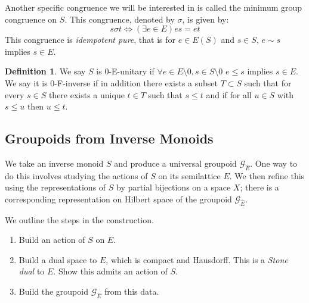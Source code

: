 \documentclass[11pt]{amsart}
\theoremstyle{plain}
\theoremstyle{definition}%
\newtheorem{definition}[theorem]{Definition}%
\theoremstyle{remark}%
\newcommand{\G}{\mathcal{G}}
\newcommand{\E}{\widehat{E}}
\begin{document}
Another specific congruence we will be interested in is called the minimum group congruence on $S$.  This congruence, denoted by $\sigma$, is given by:
\begin{equation*}
s \sigma t \Leftrightarrow (\exists e \in E) es = et
\end{equation*}
This congruence is \textit{idempotent pure}, that is for $e \in E(S)$ and $s \in S$, $e \sim s$ implies $s \in E$.

\begin{definition}
We say $S$ is 0-E-unitary if $\forall e \in E\setminus 0, s \in S \setminus 0$ $e \leq s$ implies $s \in E$. We say it is 0-F-inverse if in addition there exists a subset $T \subset S$ such that for every $s \in S$ there exists a unique $t \in T$ such that $s \leq t$ and if for all $u \in S$ with $s \leq u$ then $u \leq t$.
\end{definition}

\subsection{Groupoids from Inverse Monoids}
We take an inverse monoid $S$ and produce a universal groupoid $\G_{\E}$. One way to do this involves studying the actions of $S$ on its semilattice $E$. We then refine this using  the representations of $S$ by partial bijections on a space $X$; there is a corresponding representation on Hilbert space of the groupoid $\G_{\E}$.

We outline the steps in the construction.
\begin{enumerate}
\item Build an action of $S$ on $E$.
\item Build a dual space to $E$, which is compact and Hausdorff. This is a \textit{Stone dual} to $E$. Show this admits an action of $S$.
\item Build the groupoid $\G_{\E}$ from this data.
\end{enumerate}
\end{document}
